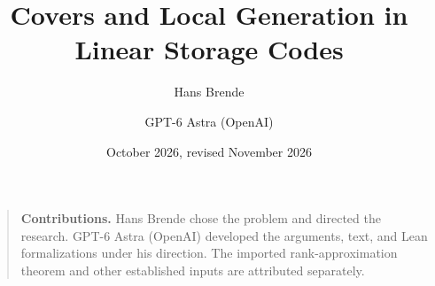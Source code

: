 \documentclass[11pt]{article}
\title{Covers and Local Generation in Linear Storage Codes}
\author{Hans Brende \and GPT-6 Astra (OpenAI)}
\date{October 2026, revised November 2026}
\numberwithin{equation}{section}
\begin{document}
\maketitle
\begin{abstract}

\end{abstract}
\begin{quote}\small
\textbf{Contributions.} Hans Brende chose the problem and directed the
research. GPT-6 Astra (OpenAI) developed the arguments, text, and Lean
formalizations under his direction. The imported rank-approximation theorem
and other established inputs are attributed separately.
\end{quote}
\clearpage
\tableofcontents
\clearpage












\appendix




\begingroup\small\raggedright


\endgroup
\end{document}

